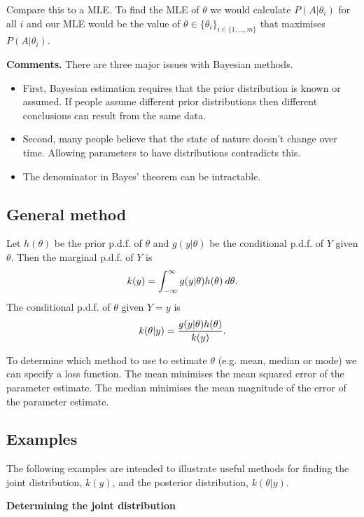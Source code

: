 \documentclass[10pt, two column]{article}
\begin{document}
Compare this to a MLE. To find the MLE of $\theta$ we would calculate $P(A \vert \theta_{i})$ for all $i$ and our MLE would be the value of $\theta \in \{ \theta_{i} \}_{i \in \{ 1, \dots, m\}}$ that maximises $P(A \vert \theta_{i})$.

{\bf Comments.} There are three major issues with Bayesian methods.
\begin{itemize}
\item First, Bayesian estimation requires that the prior distribution is known or assumed. If people assume different prior distributions then different conclusions can result from the same data. 
\item Second, many people believe that the state of nature doesn't change over time. Allowing parameters to have distributions contradicts this. 
\item The denominator in Bayes' theorem can be intractable. 
\end{itemize}

\subsection{General method}

Let $h(\theta)$ be the prior p.d.f. of $\theta$ and $g(y \vert \theta)$ be the conditional p.d.f. of $Y$ given $\theta$. Then the marginal p.d.f. of $Y$ is \vspace{-6pt}
\[
k(y) = \int_{-\infty}^{\infty} g(y\vert \theta) h(\theta) \: d\theta. \vspace{-6pt}
\]
The conditional p.d.f. of $\theta$ given $Y=y$ is \vspace{-6pt}
\[
k(\theta \vert y) = \frac{g(y \vert \theta) h(\theta)}{k(y)}. \vspace{-6pt}
\]

To determine which method to use to estimate $\theta$  (e.g. mean, median or mode) we can specify a loss function. The mean minimises the mean squared error of the parameter estimate. The median minimises the mean magnitude of the error of the parameter estimate. 

\subsection{Examples}

The following examples are intended to illustrate useful methods for finding the joint distribution, $k(y)$, and the posterior distribution, $k(\theta \vert y)$.

{\bf Determining the joint distribution}
\end{document}
